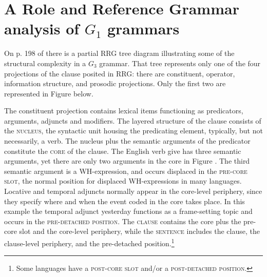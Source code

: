 \documentclass[output=paper,colorlinks,citecolor=brown]{langscibook}
\begin{document}
\section{A Role and Reference Grammar analysis of $G_1$ grammars}\label{sec:vanvalin:3}

On p. 198 of  there is a partial RRG tree diagram illustrating some of the structural complexity in a $G_3$ grammar.  That tree represents only one of the four projections of the clause posited in RRG: there are constituent, operator, information structure, and prosodic projections. Only the first two are represented in Figure  below.  

The constituent projection contains lexical items functioning as predicators, arguments, adjuncts and modifiers.  The layered structure of the clause consists of the \textsc{nucleus}, the syntactic unit housing the predicating element, typically, but not necessarily, a verb.  The nucleus plus the semantic arguments of the predicator constitute the \textsc{core} of the clause.  The English verb give has three semantic arguments, yet there are only two arguments in the core in Figure . The third semantic argument is a WH-expression, and occurs displaced in the \textsc{pre-core slot}, the normal position for displaced WH-expressions in many languages. Locative and temporal adjuncts normally appear in the core-level periphery, since they specify where and when the event coded in the core takes place.  In this example the temporal adjunct yesterday functions as a frame-setting topic and occurs in the \textsc{pre-detached position}.  The \textsc{clause} contains the core plus the pre-core slot and the core-level periphery, while the \textsc{sentence} includes the clause, the clause-level periphery, and the pre-detached position.\footnote{Some languages have a  \textsc{post-core slot} and/or a \textsc{post-detached position}.}
\end{document}
